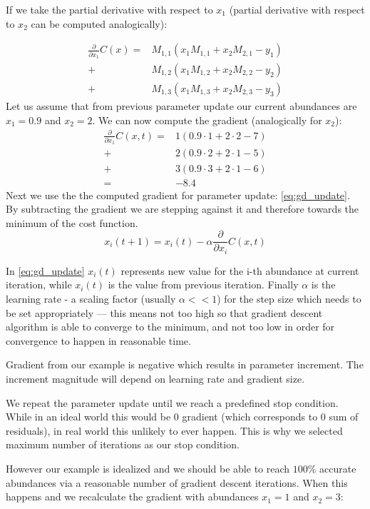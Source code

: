  If we take the partial derivative with respect to $x_1$ (partial derivative with respect to $x_2$ can be computed analogically):

  \[\begin{aligned}
  \frac{\partial}{\partial x_1} C(x)=&M_{1,1}(x_1 M_{1,1}+x_2 M_{2,1}-y_1)\\
  +&M_{1,2}(x_1 M_{1,2}+x_2 M_{2,2}-y_2)\\
  +&M_{1,3}(x_1 M_{1,3}+x_2 M_{2,3}-y_3)
 \end{aligned}\]
 Let us assume that from previous parameter update our current abundances are $x_1=0.9$ and $x_2=2$. We can now compute the gradient (analogically for $x_2$):
  \[\begin{aligned}
  \frac{\partial}{\partial x_1} C(x,t)=&1(0.9 \cdot 1+2 \cdot 2-7)\\
  +&2(0.9 \cdot 2+2 \cdot 1-5)\\
  +&3(0.9 \cdot 3+2 \cdot 1-6)\\
  =&-8.4
 \end{aligned}\]
  Next we use the the computed gradient for parameter update: \cref{eq:gd_update}. By subtracting the gradient we are stepping against it and therefore towards the minimum of the cost function.
 \begin{equation}
 x_i(t+1)=x_i(t)-\alpha\frac{\partial}{\partial x_i} C(x,t)
 \label{eq:gd_update}
  \end{equation}

 In \cref{eq:gd_update} $x_i(t)$ represents new value for the i-th abundance at current iteration, while $x_i(t)$ is the value from previous iteration. Finally $\alpha$ is the learning rate - a scaling factor (usually $\alpha<<1$) for the step size which needs to be set appropriately --- this means not too high so that gradient descent algorithm is able to converge to the minimum, and not too low in order for convergence to happen in reasonable time.
 
 Gradient from our example is negative which results in parameter increment. The increment magnitude will depend on learning rate and gradient size.
 
 We repeat the parameter update until we reach a predefined stop condition. While in an ideal world this would be 0 gradient (which corresponds to 0 sum of residuals), in real world this unlikely to ever happen. This is why we selected maximum number of iterations as our stop condition.
 
 However our example is idealized and we should be able to reach $100\%$ accurate abundances via a reasonable number of gradient descent iterations. When this happens and we recalculate the gradient with abundances $x_1=1$ and $x_2=3$:

